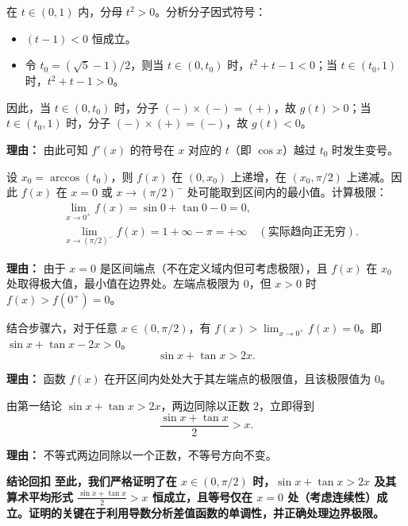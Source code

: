 \begin{proofbox}
\begin{description}[style=nextline, leftmargin=2.8em, labelsep=0.5em, itemsep=0.55em]
    \item[\textbf{步骤五（分区间讨论）：}] 在 $t \in (0,1)$ 内，分母 $t^2 > 0$。分析分子因式符号：
    \begin{itemize}
        \item $(t-1) < 0$ 恒成立。
        \item 令 $t_0 = (\sqrt{5}-1)/2$，则当 $t \in (0, t_0)$ 时，$t^2 + t - 1 < 0$；当 $t \in (t_0, 1)$ 时，$t^2 + t - 1 > 0$。
    \end{itemize}
    因此，当 $t \in (0, t_0)$ 时，分子 $(-) \times (-) = (+)$，故 $g(t) > 0$；当 $t \in (t_0, 1)$ 时，分子 $(-) \times (+) = (-)$，故 $g(t) < 0$。
    \par\textbf{理由：} 由此可知 $f'(x)$ 的符号在 $x$ 对应的 $t$（即 $\cos x$）越过 $t_0$ 时发生变号。

    \item[\textbf{步骤六（确定原函数最小值）：}] 设 $x_0 = \arccos(t_0)$，则 $f(x)$ 在 $(0, x_0)$ 上递增，在 $(x_0, \pi/2)$ 上递减。因此 $f(x)$ 在 $x=0$ 或 $x \to (\pi/2)^-$ 处可能取到区间内的最小值。计算极限：
    \[
    \begin{aligned}
    &\lim_{x \to 0^+} f(x) = \sin 0 + \tan 0 - 0 = 0, \\
    &\lim_{x \to (\pi/2)^-} f(x) = 1 + \infty - \pi = +\infty \quad (\text{实际趋向正无穷}).
    \end{aligned}
    \]
    \par\textbf{理由：} 由于 $x=0$ 是区间端点（不在定义域内但可考虑极限），且 $f(x)$ 在 $x_0$ 处取得极大值，最小值在边界处。左端点极限为 $0$，但 $x>0$ 时 $f(x) > f(0^+)=0$。

    \item[\textbf{步骤七（得出结论）：}] 结合步骤六，对于任意 $x \in (0, \pi/2)$，有 $f(x) > \lim_{x \to 0^+} f(x) = 0$。即 $\sin x + \tan x - 2x > 0$。
    \[
    \sin x + \tan x > 2x.
    \]
    \par\textbf{理由：} 函数 $f(x)$ 在开区间内处处大于其左端点的极限值，且该极限值为 $0$。

    \item[\textbf{步骤八（推导第二结论）：}] 由第一结论 $\sin x + \tan x > 2x$，两边同除以正数 $2$，立即得到
    \[
    \frac{\sin x + \tan x}{2} > x.
    \]
    \par\textbf{理由：} 不等式两边同除以一个正数，不等号方向不变。
\end{description}

\medskip
\textbf{\textcolor{CProof}{结论回扣}}
\textbf{至此，我们严格证明了在 $x \in (0,\pi/2)$ 时，$\sin x + \tan x > 2x$ 及其算术平均形式 $\frac{\sin x + \tan x}{2} > x$ 恒成立，且等号仅在 $x=0$ 处（考虑连续性）成立。证明的关键在于利用导数分析差值函数的单调性，并正确处理边界极限。}
\end{proofbox}
